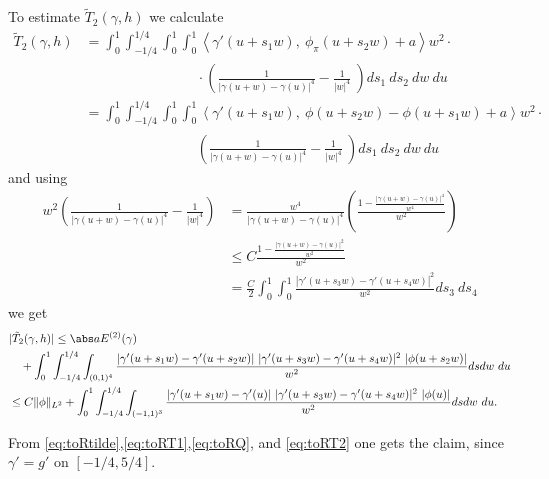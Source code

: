 To estimate $\tilde T_2 (\gamma,h)$ we calculate
\begin{align*}
 \tilde T_2(\gamma,h)
 &= \int_{0}^{1}\int_{-1/4}^{1/4} \int_0^1 \int_0^1
  \left\langle \gamma'(u+s_1 w),\  \phi_\pi(u+s_2 w) 
  + a\right\rangle w^2\cdot\\
  &\qquad\qquad\qquad\qquad{}\cdot\left( \frac 1 {|\gamma(u+w)-\gamma(u)|^4}-
 \frac1{|w|^4}\ \right) ds_1\ ds_2\ dw\ du\\
 &= \int_{0}^{1}\int_{-1/4}^{1/4} \int_0^1 \int_0^1
  \left\langle \gamma'(u+s_1 w),\ \phi(u+s_2 w)- \phi(u+s_1 w) 
+ a \right\rangle w^2 \cdot\\
&\qquad\qquad\qquad\qquad{}\left( \frac 1 {|\gamma(u+w)-\gamma(u)|^4}-
 \frac1{|w|^4}\ \right) ds_1\ ds_2\ dw\ du
\end{align*}
and using
\begin{align*}
 w^2 \left( \frac 1 {|\gamma(u+w)-\gamma(u)|^4}- \frac 1 {|w|^4} \right) 
  & = \frac {w^4} {|\gamma(u+w)-\gamma(u)|^4} 
      \left( \frac {1 - \frac {|\gamma(u+w)- \gamma(u)|^4} {w^4}}{w^2}\right) \\
 & \leq C \frac {1 - \frac {|\gamma(u+w)- \gamma(u)|^2} {w^2}}{w^2} \\
 &  = \frac C 2 \int_{0}^1 \int_0^1 \frac {|\gamma'(u+s_3 w) - \gamma'(u+s_4 w)|^2}{w^2}ds_3 \ ds_4
\end{align*}
we get
\begin{equation} \label{eq:toRT2}
\begin{aligned}
 &|\tilde T_2(\gamma,h)|  \leq \abs a E^{(2)} (\gamma) \\ &\quad  + \int_{0}^{1}\int_{-1/4}^{1/4} \int_{(0,1)^4}
 \frac{ |\gamma'(u+s_1 w)-\gamma'(u+s_2w)| \ |\gamma'(u+s_3 w) - \gamma'(u+s_4 w)|^2 \ 
|\phi(u+s_2 w)|}{w^2}  dsdw\ du \\
& \leq C \|\phi\|_{L^2} + \int_{0}^{1}\int_{-1/4}^{1/4} \int_{(-1,1)^3}
 \frac{ |\gamma'(u+s_1 w)-\gamma'(u)| \ |\gamma'(u+s_3 w) - \gamma'(u+s_4 w)|^2 \ 
|\phi(u)|}{w^2}  dsdw\ du.
\end{aligned}
\end{equation}

From \eqref{eq:toRtilde},\eqref{eq:toRT1},\eqref{eq:toRQ}, and \eqref{eq:toRT2} 
one gets the claim, since $\gamma' = g'$ on $[-1/4,5/4]$.
